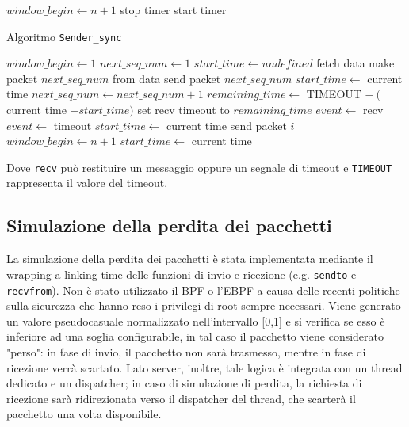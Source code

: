 \documentclass[12pt]{article}
\begin{document}
{\begin{algorithm}[H]
\begin{algorithmic}[1]
        \State $window\_begin \gets n + 1$
        \State stop timer
            \State start timer
        \EndIf
    \EndEvent
\EndWhile
\end{algorithmic}
\end{algorithm}
    
\begin{algorithm}[H]
\caption{Algoritmo \texttt{Sender\_sync}}
\begin{algorithmic}[1]
\State $window\_begin \gets 1$
\State $next\_seq\_num \gets 1$
\State $start\_time \gets undefined$
        \State fetch data
        \State make packet $next\_seq\_num$ from data
        \State send packet $next\_seq\_num$
            \State $start\_time \gets $ current time
        \EndIf
        \State $next\_seq\_num \gets next\_seq\_num + 1$
    \EndWhile
    \State $remaining\_time \gets $ TIMEOUT $-\ ($current time $- start\_time)$
        \State set recv timeout to $remaining\_time$
        \State $event \gets$ recv
    \Else
        \State $event \gets$ timeout
    \EndIf
        \State $start\_time \gets $ current time
            \State send packet $i$
        \EndFor
        \State $window\_begin \gets n + 1$
            \State $start\_time \gets $ current time
        \EndIf
    \EndIf
\EndWhile
\end{algorithmic}
\end{algorithm}

Dove \texttt{recv} può restituire un messaggio oppure un segnale di timeout e \texttt{TIMEOUT} rappresenta il valore del timeout.

\subsection{Simulazione della perdita dei pacchetti}

La simulazione della perdita dei pacchetti è stata implementata mediante il wrapping a linking time delle funzioni di invio e ricezione (e.g. \texttt{sendto} e \texttt{recvfrom}).
Non è stato utilizzato il BPF o l'EBPF a causa delle recenti politiche sulla sicurezza che hanno reso i privilegi di root sempre necessari.
Viene generato un valore pseudocasuale normalizzato nell'intervallo [0,1] e si verifica se esso è inferiore ad una soglia configurabile, in tal caso il pacchetto viene considerato "perso": in fase di invio, il pacchetto non sarà trasmesso, mentre in fase di ricezione verrà scartato.
Lato server, inoltre, tale logica è integrata con un thread dedicato e un dispatcher; in caso di simulazione di perdita, la richiesta di ricezione sarà ridirezionata verso il dispatcher del thread, che scarterà il pacchetto una volta disponibile.

}
\end{document}
